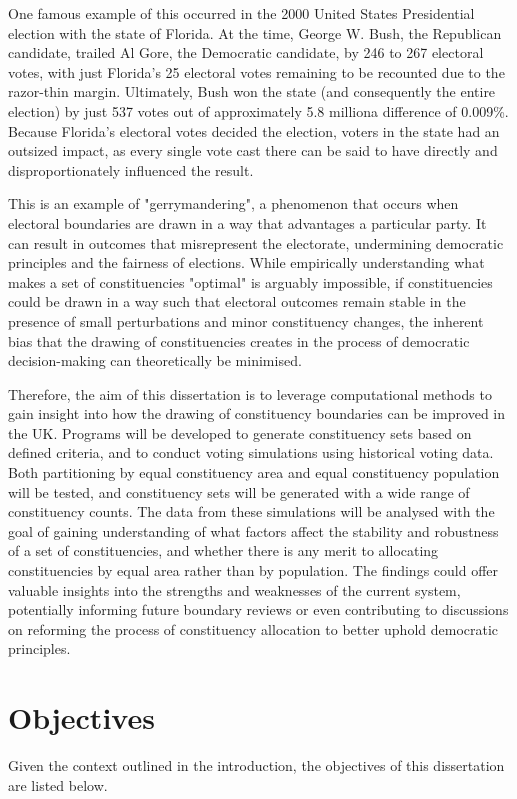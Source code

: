 \documentclass{article}
\begin{document}
One famous example of this occurred in the 2000 United States Presidential election with the state of Florida. 
At the time, George W. Bush, the Republican candidate, trailed Al Gore, the Democratic candidate, by 246 to 267 electoral votes, with just Florida's 25 electoral votes remaining to be
recounted due to the razor-thin margin. Ultimately, Bush won the state (and consequently the entire election) by just 537 votes out of approximately 5.8 million\textemdash a difference of 0.009\%. 
Because Florida's electoral votes decided the election, voters in the state had an outsized impact, as every single vote cast there can be said to have directly and disproportionately influenced the result.

This is an example of "gerrymandering", a phenomenon that occurs when electoral boundaries are drawn in a way that advantages a particular party. It can result in outcomes that misrepresent 
the electorate, undermining democratic principles and the fairness of elections. While empirically understanding what makes a set of constituencies "optimal" is arguably impossible,
if constituencies could be drawn in a way such that electoral outcomes remain stable in the presence of small perturbations 
and minor constituency changes, the inherent bias that the drawing of constituencies creates in the process of democratic decision-making can theoretically be minimised.

Therefore, the aim of this dissertation is to leverage computational methods to gain insight into how the drawing of constituency boundaries can be improved in the UK.
Programs will be developed to generate constituency sets based on defined criteria, and to conduct voting simulations using historical voting data. Both partitioning by 
equal constituency area and equal constituency population will be tested, and constituency sets will be generated with a wide range of constituency counts. The data from these
simulations will be analysed with the goal of gaining understanding of what factors affect the stability and robustness of a set of constituencies, and whether there is any merit to
allocating constituencies by equal area rather than by population. The findings could offer valuable insights into the strengths and weaknesses of the current system, potentially informing
future boundary reviews or even contributing to discussions on reforming the process of constituency allocation to better uphold democratic principles.

\section{Objectives}
Given the context outlined in the introduction, the objectives of this dissertation are listed below.
\end{document}

